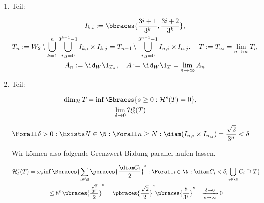 \begin{solution}

\phantom{}

\begin{enumerate}[label = \arabic*.]

    \item Teil:
    
    \begin{gather*}
        I_{k, i}
        :=
        \bbraces
        {
            \frac{3 i + 1}{3^k},
            \frac{3 i + 2}{3^k}
        }, \\
        T_n
        :=
        W_2
        \setminus
        \bigcup_{k=1}^n
            \bigcup_{i, j = 0}^{3^{k-1} - 1}
                I_{k, i} \times I_{k, j}
        =
        T_{n-1}
        \setminus
        \bigcup_{i, j = 0}^{3^{n-1} - 1}
            I_{n, i} \times I_{n, j},
        \quad
        T
        :=
        T_\infty
        =
        \lim_{n \to \infty}
            T_n \\
        A_n
        :=
        \id_W \1_{T_n},
        \quad
        A
        :=
        \id_W \1_T
        =
        \lim_{n \to \infty}
            A_n
    \end{gather*}

    \item Teil:

    \begin{gather*}
        \dim_\mathcal{H} T
        =
        \inf
        \Bbraces
        {
            s \geq 0:
            \mathcal{H}^s(T) = 0
        }, \\
        \lim_{\delta \to 0}
            \mathcal{H}_\delta^s(T)
    \end{gather*}

    \begin{align*}
        \Forall \delta > 0:
            \Exists N \in \N:
                \Forall n \geq N:
                    \diam(I_{n, i} \times I_{n, j})
                    =
                    \frac{\sqrt 2}{3^n}
                    <
                    \delta
    \end{align*}

    Wir können also folgende Grenzwert-Bildung parallel laufen lassen.

    \begin{multline*}
        \mathcal{H}_\delta^s(T)
        =
        \omega_s
        \inf
        \Bbraces
        {
            \sum_{i \in \N}
                \pbraces
                {
                    \frac{\diam C_i}{2}
                }^s:
            \Forall i \in \N:
                \diam C_i < \delta,
            \bigcup_{i \in \N}
                C_i
            \supseteq
            T
        } \\
        \leq
        8^n
        \pbraces
        {
            \frac
            {
                \frac{\sqrt 2}{3^n}
            }{2}
        }^s
        =
        \pbraces
        {
            \frac{\sqrt 2}{2}
        }^s
        \pbraces
        {
            \frac{8}{3^s}
        }^n
        =
        \xrightarrow[n \to \infty]{\delta \to 0}
        0
    \end{multline*}


\end{enumerate}
\end{solution}
